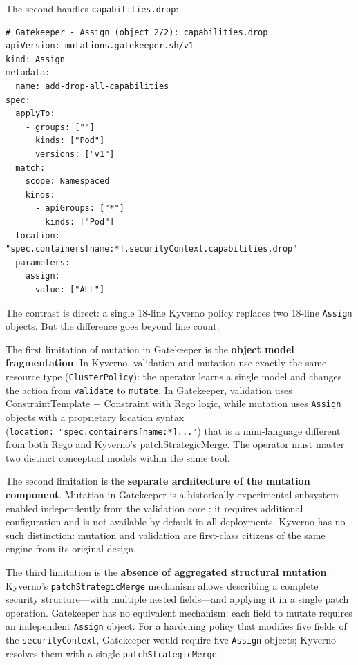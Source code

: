 The second handles \texttt{capabilities.drop}:

\begin{lstlisting}
# Gatekeeper - Assign (object 2/2): capabilities.drop
apiVersion: mutations.gatekeeper.sh/v1
kind: Assign
metadata:
  name: add-drop-all-capabilities
spec:
  applyTo:
    - groups: [""]
      kinds: ["Pod"]
      versions: ["v1"]
  match:
    scope: Namespaced
    kinds:
      - apiGroups: ["*"]
        kinds: ["Pod"]
  location: "spec.containers[name:*].securityContext.capabilities.drop"
  parameters:
    assign:
      value: ["ALL"]
\end{lstlisting}

The contrast is direct: a single 18-line Kyverno policy replaces two 18-line \texttt{Assign} objects. But the difference goes beyond line count.

The first limitation of mutation in Gatekeeper is the \textbf{object model fragmentation}. In Kyverno, validation and mutation use exactly the same resource type (\texttt{ClusterPolicy}): the operator learns a single model and changes the action from \texttt{validate} to \texttt{mutate}. In Gatekeeper, validation uses ConstraintTemplate + Constraint with Rego logic, while mutation uses \texttt{Assign} objects with a proprietary location syntax (\texttt{location:\,"spec.containers[name:*]..."}) that is a mini-language different from both Rego and Kyverno's patchStrategicMerge. The operator must master two distinct conceptual models within the same tool.

The second limitation is the \textbf{separate architecture of the mutation component}. Mutation in Gatekeeper is a historically experimental subsystem enabled independently from the validation core \cite{gatekeeper_mutation}: it requires additional configuration and is not available by default in all deployments. Kyverno has no such distinction: mutation and validation are first-class citizens of the same engine from its original design.

The third limitation is the \textbf{absence of aggregated structural mutation}. Kyverno's \texttt{patchStrategicMerge} mechanism allows describing a complete security structure---with multiple nested fields---and applying it in a single patch operation. Gatekeeper has no equivalent mechanism: each field to mutate requires an independent \texttt{Assign} object. For a hardening policy that modifies five fields of the \texttt{securityContext}, Gatekeeper would require five \texttt{Assign} objects; Kyverno resolves them with a single \texttt{patchStrategicMerge}.

